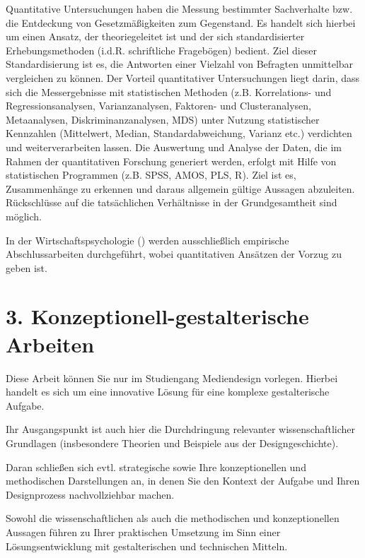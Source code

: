 Quantitative Untersuchungen haben die Messung bestimmter Sachverhalte bzw. die Entdeckung von Gesetzmäßigkeiten zum Gegenstand. Es handelt sich hierbei um einen Ansatz, der theoriegeleitet ist und der sich standardisierter Erhebungsmethoden (i.d.R. schriftliche Fragebögen) bedient. Ziel dieser Standardisierung ist es, die Antworten einer Vielzahl von Befragten unmittelbar vergleichen zu können. Der Vorteil quantitativer Untersuchungen liegt darin, dass sich die Messergebnisse mit statistischen Methoden (z.B. Korrelations- und Regressionsanalysen, Varianzanalysen, Faktoren- und Clusteranalysen, Metaanalysen, Diskriminanzanalysen, MDS) unter Nutzung statistischer Kennzahlen (Mittelwert, Median, Standardabweichung, Varianz etc.) verdichten und weiterverarbeiten lassen. Die Auswertung und Analyse der Daten, die im Rahmen der quantitativen Forschung generiert werden, erfolgt mit Hilfe von statistischen Programmen (z.B. SPSS, AMOS, PLS, R). Ziel ist es, Zusammenhänge zu erkennen und daraus allgemein gültige Aussagen abzuleiten. Rückschlüsse auf die tatsächlichen Verhältnisse in der Grundgesamtheit sind möglich.

In der Wirtschaftspsychologie () werden ausschließlich empirische Abschlussarbeiten durchgeführt, wobei quantitativen Ansätzen der Vorzug zu geben ist.

\section*{3. Konzeptionell-gestalterische Arbeiten}

Diese Arbeit können Sie nur im Studiengang Mediendesign vorlegen. Hierbei handelt es sich um eine innovative Lösung für eine komplexe gestalterische Aufgabe.

Ihr Ausgangspunkt ist auch hier die Durchdringung relevanter wissenschaftlicher Grundlagen (insbesondere Theorien und Beispiele aus der Designgeschichte).

Daran schließen sich evtl. strategische sowie Ihre konzeptionellen und methodischen Darstellungen an, in denen Sie den Kontext der Aufgabe und Ihren Designprozess nachvollziehbar machen.

Sowohl die wissenschaftlichen als auch die methodischen und konzeptionellen Aussagen führen zu Ihrer praktischen Umsetzung im Sinn einer Lösungsentwicklung mit gestalterischen und technischen Mitteln.